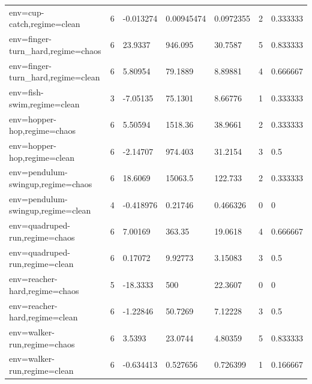\begin{tabular}{lllllll}
env=cup-catch,regime=clean & 6 & -0.013274 & 0.00945474 & 0.0972355 & 2 & 0.333333 \\
env=finger-turn\_hard,regime=chaos & 6 & 23.9337 & 946.095 & 30.7587 & 5 & 0.833333 \\
env=finger-turn\_hard,regime=clean & 6 & 5.80954 & 79.1889 & 8.89881 & 4 & 0.666667 \\
env=fish-swim,regime=clean & 3 & -7.05135 & 75.1301 & 8.66776 & 1 & 0.333333 \\
env=hopper-hop,regime=chaos & 6 & 5.50594 & 1518.36 & 38.9661 & 2 & 0.333333 \\
env=hopper-hop,regime=clean & 6 & -2.14707 & 974.403 & 31.2154 & 3 & 0.5 \\
env=pendulum-swingup,regime=chaos & 6 & 18.6069 & 15063.5 & 122.733 & 2 & 0.333333 \\
env=pendulum-swingup,regime=clean & 4 & -0.418976 & 0.21746 & 0.466326 & 0 & 0 \\
env=quadruped-run,regime=chaos & 6 & 7.00169 & 363.35 & 19.0618 & 4 & 0.666667 \\
env=quadruped-run,regime=clean & 6 & 0.17072 & 9.92773 & 3.15083 & 3 & 0.5 \\
env=reacher-hard,regime=chaos & 5 & -18.3333 & 500 & 22.3607 & 0 & 0 \\
env=reacher-hard,regime=clean & 6 & -1.22846 & 50.7269 & 7.12228 & 3 & 0.5 \\
env=walker-run,regime=chaos & 6 & 3.5393 & 23.0744 & 4.80359 & 5 & 0.833333 \\
env=walker-run,regime=clean & 6 & -0.634413 & 0.527656 & 0.726399 & 1 & 0.166667 \\
\bottomrule
\end{tabular}
